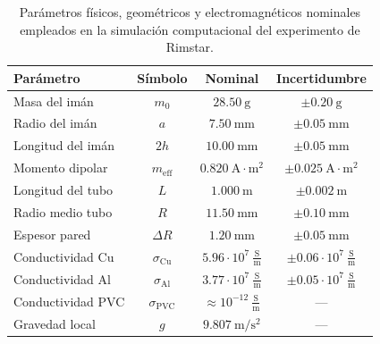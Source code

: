 \begin{table}[htbp]
\centering
\footnotesize
\setlength{\tabcolsep}{2.5pt}
\caption{Parámetros físicos, geométricos y electromagnéticos nominales empleados en la simulación computacional del experimento de Rimstar.}
\label{tab:parametros}
\begin{ruledtabular}
\begin{tabular}{lccc}
\textbf{Parámetro} & \textbf{Símbolo} & \textbf{Nominal} & \textbf{Incertidumbre} \\
\hline
Masa del imán & $m_0$ & $28.50\ \mathrm{g}$ & $\pm 0.20\ \mathrm{g}$ \\
Radio del imán & $a$ & $7.50\ \mathrm{mm}$ & $\pm 0.05\ \mathrm{mm}$ \\
Longitud del imán & $2h$ & $10.00\ \mathrm{mm}$ & $\pm 0.05\ \mathrm{mm}$ \\
Momento dipolar & $m_{\mathrm{eff}}$ & $0.820\ \mathrm{A\cdot m^2}$ & $\pm 0.025\ \mathrm{A\cdot m^2}$ \\
Longitud del tubo & $L$ & $1.000\ \mathrm{m}$ & $\pm 0.002\ \mathrm{m}$ \\
Radio medio tubo & $R$ & $11.50\ \mathrm{mm}$ & $\pm 0.10\ \mathrm{mm}$ \\
Espesor pared & $\Delta R$ & $1.20\ \mathrm{mm}$ & $\pm 0.05\ \mathrm{mm}$ \\
Conductividad Cu & $\sigma_{\mathrm{Cu}}$ & $5.96 \cdot 10^7\ \frac{\mathrm{S}}{\mathrm{m}}$ & $\pm 0.06 \cdot 10^7\ \frac{\mathrm{S}}{\mathrm{m}}$ \\
Conductividad Al & $\sigma_{\mathrm{Al}}$ & $3.77 \cdot 10^7\ \frac{\mathrm{S}}{\mathrm{m}}$ & $\pm 0.05 \cdot 10^7\ \frac{\mathrm{S}}{\mathrm{m}}$ \\
Conductividad PVC & $\sigma_{\mathrm{PVC}}$ & $\approx 10^{-12}\ \frac{\mathrm{S}}{\mathrm{m}}$ & --- \\
Gravedad local & $g$ & $9.807\ \mathrm{m/s^2}$ & --- \\
\end{tabular}
\end{ruledtabular}
\end{table}
